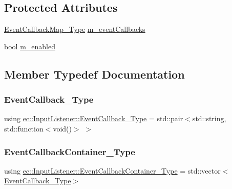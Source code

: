 \subsection*{Protected Attributes}
\begin{DoxyCompactItemize}
\item 
\mbox{\hyperlink{classec_1_1_input_listener_a74ebbc0d4a31fcda8b6cda624e5ecdd1}{Event\+Callback\+Map\+\_\+\+Type}} \mbox{\hyperlink{classec_1_1_input_listener_a25d3ab10346fa26de7737ded4f1b7318}{m\+\_\+event\+Callbacks}}
\item 
bool \mbox{\hyperlink{classec_1_1_input_listener_af36b5fc46ed59886d73b1613aaef5a47}{m\+\_\+enabled}}
\end{DoxyCompactItemize}


\subsection{Member Typedef Documentation}
\mbox{\label{classec_1_1_input_listener_acc8376886aac460c21a980c411cc1d15}} 
\subsubsection{\texorpdfstring{Event\+Callback\+\_\+\+Type}{EventCallback\_Type}}
{\footnotesize\ttfamily using \mbox{\hyperlink{classec_1_1_input_listener_acc8376886aac460c21a980c411cc1d15}{ec\+::\+Input\+Listener\+::\+Event\+Callback\+\_\+\+Type}} =  std\+::pair$<$std\+::string, std\+::function$<$void()$>$ $>$}

\mbox{\label{classec_1_1_input_listener_a0d9334fafd46399a39448fe00fad3c2e}} 
\subsubsection{\texorpdfstring{Event\+Callback\+Container\+\_\+\+Type}{EventCallbackContainer\_Type}}
{\footnotesize\ttfamily using \mbox{\hyperlink{classec_1_1_input_listener_a0d9334fafd46399a39448fe00fad3c2e}{ec\+::\+Input\+Listener\+::\+Event\+Callback\+Container\+\_\+\+Type}} =  std\+::vector$<$\mbox{\hyperlink{classec_1_1_input_listener_acc8376886aac460c21a980c411cc1d15}{Event\+Callback\+\_\+\+Type}}$>$}

